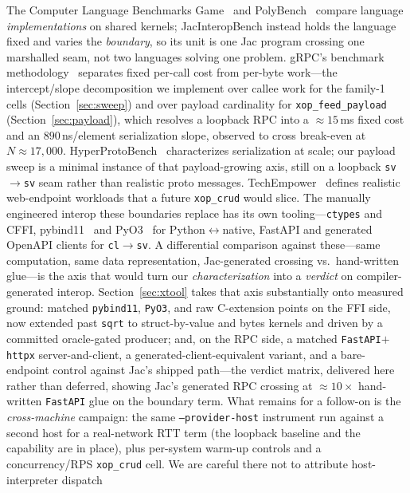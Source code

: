 \documentclass[conference]{IEEEtran}
\newcommand{\code}[1]{\texttt{#1}}
\begin{document}
The Computer Language Benchmarks Game~\cite{clbg} and PolyBench~\cite{polybench}
compare language \emph{implementations} on shared kernels; JacInteropBench instead
holds the language fixed and varies the \emph{boundary}, so its unit is one Jac
program crossing one marshalled seam, not two languages solving one problem.
gRPC's benchmark methodology~\cite{grpc} separates fixed per-call cost from
per-byte work---the intercept/slope decomposition we implement over callee work
for the family-1 cells (Section~\ref{sec:sweep}) and over payload cardinality for
\code{xop\_feed\_payload} (Section~\ref{sec:payload}), which resolves a loopback
RPC into a $\approx$$15$\,ms fixed cost and an $890$\,ns/element serialization
slope, observed to cross break-even at $N\approx17{,}000$. HyperProtoBench~\cite{hyperproto} characterizes serialization at scale;
our payload sweep is a minimal instance of that payload-growing axis, still on a
loopback \code{sv$\rightarrow$sv} seam rather than realistic proto messages. TechEmpower~\cite{techempower} defines realistic web-endpoint
workloads that a future \code{xop\_crud} would slice. The manually engineered interop these boundaries replace has its own
tooling---\code{ctypes} and CFFI, pybind11~\cite{pybind11} and
PyO3~\cite{pyo3} for Python$\leftrightarrow$native, FastAPI and generated
OpenAPI clients for \code{cl}$\rightarrow$\code{sv}. A differential comparison
against these---same computation, same data representation, Jac-generated
crossing vs.\ hand-written glue---is the axis that would turn our
\emph{characterization} into a \emph{verdict} on compiler-generated interop.
Section~\ref{sec:xtool} takes that axis substantially onto measured ground:
matched \code{pybind11}, \code{PyO3}, and raw C-extension points on the FFI side,
now extended past \code{sqrt} to struct-by-value and bytes kernels and driven by
a committed oracle-gated producer; and, on the RPC side, a matched
\code{FastAPI}$+$\code{httpx} server-and-client, a generated-client-equivalent
variant, and a bare-endpoint control against Jac's shipped path---the verdict
matrix, delivered here rather than deferred, showing Jac's generated RPC crossing
at $\approx$$10\times$ hand-written \code{FastAPI} glue on the boundary term. What
remains for a follow-on is the \emph{cross-machine} campaign: the same
\code{--provider-host} instrument run against a second host for a real-network
RTT term (the loopback baseline and the capability are in place), plus
per-system warm-up controls and a concurrency/RPS \code{xop\_crud} cell. We are careful there not to attribute host-interpreter dispatch
\end{document}

